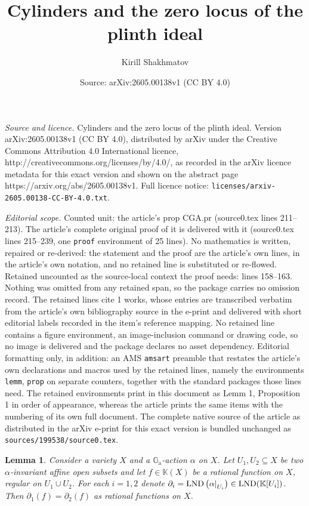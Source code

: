 \documentclass[10pt,a4paper]{amsart}
\title{Cylinders and the zero locus of the plinth ideal}
\author{Kirill Shakhmatov}
\date{Source: arXiv:2605.00138v1 (CC BY 4.0)}
\newtheorem{lemm}{Lemma}
\newcommand{\Ga}{\bb{G}_\mathrm{a}}
\DeclareMathOperator{\LND}{LND}
\newcommand{\bb}{\mathbb}
\newcommand{\der}{\partial}
\newcommand{\restrict}[2]{
    \left.
    \kern-\nulldelimiterspace{#1}
    \right|_{#2}
}
\begin{document}
\maketitle

\noindent\emph{Source and licence.} Cylinders and the zero locus of the plinth ideal. Version arXiv:2605.00138v1 (CC BY 4.0), distributed by arXiv under the Creative Commons Attribution 4.0 International licence, http://creativecommons.org/licenses/by/4.0/, as recorded in the arXiv licence metadata for this exact version and shown on the abstract page https://arxiv.org/abs/2605.00138v1. Full licence notice: \texttt{licenses/arxiv-2605.00138-CC-BY-4.0.txt}.\par\smallskip

\noindent\textit{Editorial scope.} Counted unit: the article's prop CGA.pr (source0.tex lines 211--213). The article's complete original proof of it is delivered with it (source0.tex lines 215--239, one \texttt{proof} environment of 25 lines). No mathematics is written, repaired or re-derived: the statement and the proof are the article's own lines, in the article's own notation, and no retained line is substituted or re-flowed.  Retained uncounted as the source-local context the proof needs: lines 158--163.  Nothing was omitted from any retained span, so the package carries no omission record.  The retained lines cite 1 works, whose entries are transcribed verbatim from the article's own bibliography source in the e-print and delivered with short editorial labels recorded in the item's reference mapping.  No retained line contains a figure environment, an image-inclusion command or drawing code, so no image is delivered and the package declares no asset dependency.  Editorial formatting only, in addition: an AMS \texttt{amsart} preamble that restates the article's own declarations and macros used by the retained lines, namely the environments \texttt{lemm}, \texttt{prop} on separate counters, together with the standard packages those lines need.  The retained environments print in this document as Lemm 1, Proposition 1 in order of appearance, whereas the article prints the same items with the numbering of its own full document.  The complete native source of the article as distributed in the arXiv e-print for this exact version is bundled unchanged as \texttt{sources/199538/source0.tex}.
\begin{lemm} \label{GD.le}
Consider a variety $X$ and a $\Ga$-action $\alpha$ on $X$. Let $U_1, U_2 \subseteq X$ be two
\linebreak
$\alpha$-invariant affine open subsets and let $f \in \bb{K}(X)$ be a rational function on $X$, regular on $U_1 \cup U_2$. For each $i = 1, 2$ denote $\der_i = \LND \left( \restrict{\alpha}{U_i} \right) \in \LND(\bb{K}[U_i])$. Then $\der_1(f) = \der_2(f)$ as rational functions on $X$.
\end{lemm}
\end{document}
